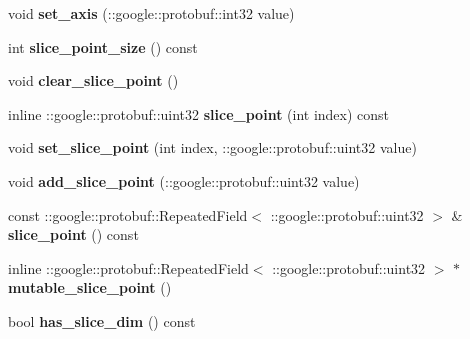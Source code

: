 \begin{DoxyCompactItemize}
\mbox{\label{classcaffe_1_1_slice_parameter_a3dbc39ce3ac89eba830b52378ed45626}} 
void {\bfseries set\+\_\+axis} (\+::google\+::protobuf\+::int32 value)
\item 
\mbox{\label{classcaffe_1_1_slice_parameter_a62ee5b4ee3d37a69ccbed1c1c90249fd}} 
int {\bfseries slice\+\_\+point\+\_\+size} () const
\item 
\mbox{\label{classcaffe_1_1_slice_parameter_af0b3d8820f3a958d0d29b75148c688f9}} 
void {\bfseries clear\+\_\+slice\+\_\+point} ()
\item 
\mbox{\label{classcaffe_1_1_slice_parameter_ab14af8ab6776ba180a4234d30e99de0c}} 
inline \+::google\+::protobuf\+::uint32 {\bfseries slice\+\_\+point} (int index) const
\item 
\mbox{\label{classcaffe_1_1_slice_parameter_aeabaa762cd7fdd41a8be814f5374b3e3}} 
void {\bfseries set\+\_\+slice\+\_\+point} (int index, \+::google\+::protobuf\+::uint32 value)
\item 
\mbox{\label{classcaffe_1_1_slice_parameter_ad95cf2a181dec985fb848d00a1578dcd}} 
void {\bfseries add\+\_\+slice\+\_\+point} (\+::google\+::protobuf\+::uint32 value)
\item 
\mbox{\label{classcaffe_1_1_slice_parameter_a68ee4f7539d358bd93c2bdbfd637fcbb}} 
const \+::google\+::protobuf\+::\+Repeated\+Field$<$ \+::google\+::protobuf\+::uint32 $>$ \& {\bfseries slice\+\_\+point} () const
\item 
\mbox{\label{classcaffe_1_1_slice_parameter_a2fb959aa30f62bcc3ed386e0f15c8884}} 
inline \+::google\+::protobuf\+::\+Repeated\+Field$<$ \+::google\+::protobuf\+::uint32 $>$ $\ast$ {\bfseries mutable\+\_\+slice\+\_\+point} ()
\item 
\mbox{\label{classcaffe_1_1_slice_parameter_a8b252220b368542a1518ed44b9c81eef}} 
bool {\bfseries has\+\_\+slice\+\_\+dim} () const
\item 

\end{DoxyCompactItemize}
